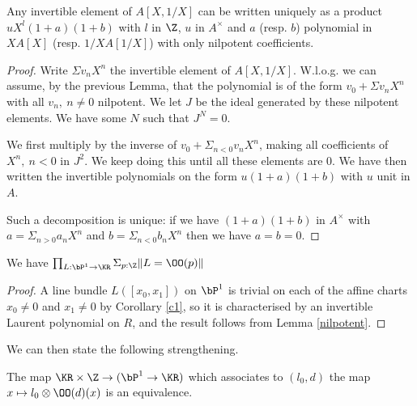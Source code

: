 \begin{lemma}\label{nilpotent}
  Any invertible element of $A[X,1/X]$ can be written uniquely as a product
  $uX^l(1+a)(1+b)$ with $l$ in $\Z$, $u$ in $A^{\times}$ and $a$ (resp. $b$)
  polynomial in $XA[X]$ (resp. $1/XA[1/X]$) with only nilpotent coefficients.
\end{lemma}

\begin{proof}
  Write $\Sigma v_nX^n$ the invertible element of $A[X,1/X]$.
  W.l.o.g. we can assume, by the previous Lemma, that the polynomial is of the form $v_0 + \Sigma v_nX^n$ with
  all $v_n,~n\neq 0$ nilpotent.
  We let $J$ be the ideal generated by these nilpotent elements.
  We have some $N$ such that $J^N = 0$.
  
  We first multiply by the inverse of $v_0 + \Sigma_{n<0}v_nX^n$, making all coefficients of
  $X^n,~n<0$ in $J^2$.
  We keep doing this until all these elements are $0$.
  We have then written the invertible polynomials on the form $u(1+a)(1+b)$ with $u$ unit in $A$.

  Such a decomposition is unique: if we have $(1+a)(1+b)$ in $A^{\times}$ with $a = \Sigma_{n> 0}a_nX^n$
  and $b = \Sigma_{n<0}b_nX^n$ then we have $a = b = 0$. %
\end{proof}

\begin{corollary}\label{Pic1}
  We have $\prod_{L:\bP^1\rightarrow \KR}\Sigma_{p:\Z}\|L = \OO(p)\|$
\end{corollary}

\begin{proof}
A line bundle $L([x_0,x_1])$ on $\bP^1$ is trivial on each of the affine charts $x_0\neq 0$ and $x_1\neq 0$ by Corollary \ref{c1}, so
it is characterised by an invertible Laurent polynomial on $R$, and the result follows from Lemma \ref{nilpotent}.
\end{proof}

We can then state the following strengthening.

\begin{proposition}\label{Matthias}
  The map $\KR\times\Z\rightarrow (\bP^1\rightarrow \KR)$
  which associates to $(l_0,d)$ the map $x\mapsto l_0\otimes \OO(d)(x)$ is an equivalence.
\end{proposition}

